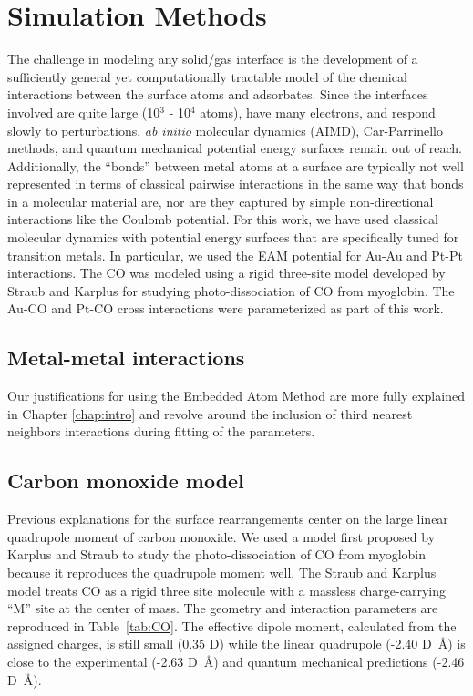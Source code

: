 
\section{Simulation Methods}
The challenge in modeling any solid/gas interface is the development
of a sufficiently general yet computationally tractable model of the
chemical interactions between the surface atoms and adsorbates.  Since
the interfaces involved are quite large (10$^3$ - 10$^4$ atoms), have
many electrons, and respond slowly to perturbations, {\it ab initio}
molecular dynamics
(AIMD),\citep{Kresse:1993ve, Kresse:1993qf, Kresse:1994ul} Car-Parrinello
methods,\citep{Car:1985bh, Izvekov:2000fv, Guidelli:2000fy} and quantum
mechanical potential energy surfaces remain out of reach.
Additionally, the ``bonds'' between metal atoms at a surface are
typically not well represented in terms of classical pairwise
interactions in the same way that bonds in a molecular material are,
nor are they captured by simple non-directional interactions like the
Coulomb potential.  For this work, we have used classical molecular
dynamics with potential energy surfaces that are specifically tuned
for transition metals.  In particular, we used the EAM potential for
Au-Au and Pt-Pt interactions.\citep{Foiles:1986ky} The CO was modeled using
a rigid three-site model developed by Straub and Karplus for studying
photo-dissociation of CO from myoglobin.\citep{Straub:1991no} The Au-CO and
Pt-CO cross interactions were parameterized as part of this work.
 
\subsection{Metal-metal interactions}
Our justifications for using the Embedded Atom Method are more fully explained
in Chapter \ref{chap:intro} and revolve around the inclusion of third nearest
neighbors interactions during fitting of the parameters.\citep{Voter:1995ax}
 
\subsection{Carbon monoxide model}
Previous explanations for the surface rearrangements center on the
large linear quadrupole moment of carbon monoxide.\citep{Tao:2010aa} We
used a model first proposed by Karplus and Straub to study the
photo-dissociation of CO from myoglobin because it reproduces the
quadrupole moment well.\citep{Straub:1991no} The Straub and Karplus model
treats CO as a rigid three site molecule with a massless
charge-carrying ``M'' site at the center of mass. The geometry and
interaction parameters are reproduced in Table~\ref{tab:CO}. The
effective dipole moment, calculated from the assigned charges, is
still small (0.35 D) while the linear quadrupole (-2.40 D~\AA) is
close to the experimental (-2.63 D~\AA)\citep{Chetty:2011dp} and quantum
mechanical predictions (-2.46 D~\AA)\citep{Rizzo:2000sp}.

